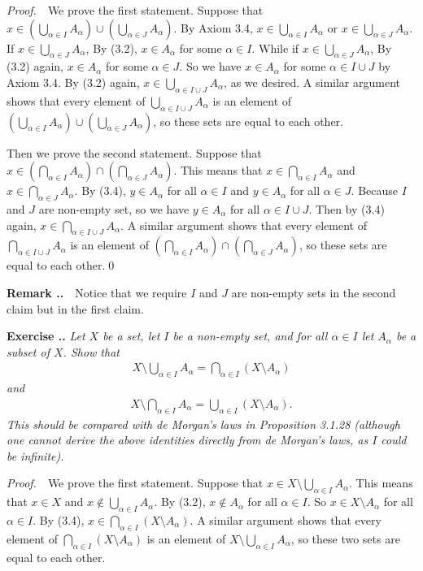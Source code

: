 \documentclass{book}
\newcommand{\pff}{\vspace{.25em}\noindent\emph{Proof.}~~}
\newcommand{\remark}{\vspace{.5em}\noindent\textbf{Remark \textbf{\theExercise}}~~}
\newcounter{Exercise}[section]
\renewcommand{\theExercise}{\thesection.\arabic{Exercise}.}
\newcommand{\new}{\vspace{1.5em}\noindent\textbf{{Exercise \stepcounter{Exercise}\textbf{\theExercise}}} }
\begin{document}
\pff We prove the first statement. Suppose that $x\in(\bigcup_{\alpha\in I}A_\alpha)\cup(\bigcup_{\alpha\in J}A_\alpha)$. By Axiom 3.4, $x\in\bigcup_{\alpha\in I}A_\alpha$ or $x\in\bigcup_{\alpha\in J}A_\alpha$. If $x\in\bigcup_{\alpha\in J}A_\alpha$, By (3.2), $x\in A_\alpha$ for some $\alpha\in I$. While if $x\in\bigcup_{\alpha\in J}A_\alpha$, By (3.2) again, $x\in A_\alpha$ for some $\alpha\in J$. So we have $x\in A_\alpha$ for some $\alpha\in I\cup J$ by Axiom 3.4. By (3.2) again, $x\in\bigcup_{\alpha\in I\cup J}A_\alpha$, as we desired. A similar argument shows that every element of $\bigcup_{\alpha\in I\cup J}A_\alpha$ is an element of $(\bigcup_{\alpha\in I}A_\alpha)\cup(\bigcup_{\alpha\in J}A_\alpha)$, so these sets are equal to each other.

Then we prove the second statement. Suppose that $x\in(\bigcap_{\alpha\in I}A_\alpha)\cap(\bigcap_{\alpha\in J}A_\alpha)$. This means that $x\in\bigcap_{\alpha\in I}A_\alpha$ and $x\in\bigcap_{\alpha\in J}A_\alpha$. By (3.4), $y\in A_\alpha$ for all $\alpha\in I$ and $y\in A_\alpha$ for all $\alpha\in J$. Because $I$ and $J$ are non-empty set, so we have $y\in A_\alpha$ for all $\alpha\in I\cup J$. Then by (3.4) again, $x\in\bigcap_{\alpha\in I\cup J}A_\alpha$. A similar argument shows that every element of $\bigcap_{\alpha\in I\cup J}A_\alpha$ is an element of $(\bigcap_{\alpha\in I}A_\alpha)\cap(\bigcap_{\alpha\in J}A_\alpha)$, so these sets are equal to each other.\qed

\remark Notice that we require $I$ and $J$ are non-empty sets in the second claim but in the first claim.

\new\emph{Let $X$ be a set, let $I$ be a non-empty set, and for all $\alpha\in I$ let $A_\alpha$ be a subset of $X$. Show that}
\begin{align*}
    X\setminus\bigcup_{\alpha\in I}A_\alpha=\bigcap_{\alpha\in I}(X\setminus A_\alpha)
\end{align*}
\emph{and}
    \begin{align*}
        X\setminus\bigcap_{\alpha\in I}A_\alpha=\bigcup_{\alpha\in I}(X\setminus A_\alpha).
    \end{align*}
\emph{This should be compared with de Morgan’s laws in Proposition 3.1.28 (although one cannot derive the above identities directly from de Morgan’s laws, as $I$ could be infinite).}

\pff We prove the first statement. Suppose that $x\in X\setminus\bigcup_{\alpha\in I}A_\alpha$. This means that $x\in X$ and $x\notin\bigcup_{\alpha\in I}A_\alpha$. By (3.2), $x\notin A_\alpha$ for all $\alpha\in I$. So $x\in X\setminus A_\alpha$ for all $\alpha\in I$. By (3.4), $x\in\bigcap_{\alpha\in I}(X\setminus A_\alpha)$. A similar argument shows that every element of $\bigcap_{\alpha\in I}(X\setminus A_\alpha)$ is an element of $X\setminus\bigcup_{\alpha\in I}A_\alpha$, so these two sets are equal to each other.
\end{document}
